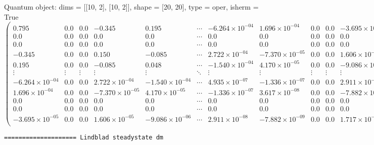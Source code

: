 \documentclass{article}
\begin{document}
    Quantum object: dims = [[10, 2], [10, 2]], shape = [20, 20], type = oper, isherm = True\begin{equation*}\begin{pmatrix}0.795 & 0.0 & 0.0 & -0.345 & 0.195 & \cdots & -6.264\times10^{-04} & 1.696\times10^{-04} & 0.0 & 0.0 & -3.695\times10^{-05}\\0.0 & 0.0 & 0.0 & 0.0 & 0.0 & \cdots & 0.0 & 0.0 & 0.0 & 0.0 & 0.0\\0.0 & 0.0 & 0.0 & 0.0 & 0.0 & \cdots & 0.0 & 0.0 & 0.0 & 0.0 & 0.0\\-0.345 & 0.0 & 0.0 & 0.150 & -0.085 & \cdots & 2.722\times10^{-04} & -7.370\times10^{-05} & 0.0 & 0.0 & 1.606\times10^{-05}\\0.195 & 0.0 & 0.0 & -0.085 & 0.048 & \cdots & -1.540\times10^{-04} & 4.170\times10^{-05} & 0.0 & 0.0 & -9.086\times10^{-06}\\\vdots & \vdots & \vdots & \vdots & \vdots & \ddots & \vdots & \vdots & \vdots & \vdots & \vdots\\-6.264\times10^{-04} & 0.0 & 0.0 & 2.722\times10^{-04} & -1.540\times10^{-04} & \cdots & 4.935\times10^{-07} & -1.336\times10^{-07} & 0.0 & 0.0 & 2.911\times10^{-08}\\1.696\times10^{-04} & 0.0 & 0.0 & -7.370\times10^{-05} & 4.170\times10^{-05} & \cdots & -1.336\times10^{-07} & 3.617\times10^{-08} & 0.0 & 0.0 & -7.882\times10^{-09}\\0.0 & 0.0 & 0.0 & 0.0 & 0.0 & \cdots & 0.0 & 0.0 & 0.0 & 0.0 & 0.0\\0.0 & 0.0 & 0.0 & 0.0 & 0.0 & \cdots & 0.0 & 0.0 & 0.0 & 0.0 & 0.0\\-3.695\times10^{-05} & 0.0 & 0.0 & 1.606\times10^{-05} & -9.086\times10^{-06} & \cdots & 2.911\times10^{-08} & -7.882\times10^{-09} & 0.0 & 0.0 & 1.717\times10^{-09}\\\end{pmatrix}\end{equation*}

    
    \begin{Verbatim}[commandchars=\\\{\}]
==================== Lindblad steadystate dm
    \end{Verbatim}
\end{document}
